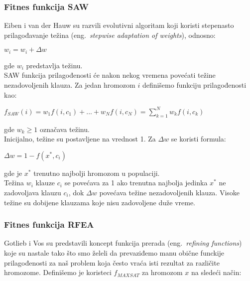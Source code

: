 \documentclass{article}
\begin{document}
\subsubsection{Fitnes funkcija SAW}
\label{sec:fitness_saw}

Eiben i van der Hauw su razvili evolutivni algoritam koji koristi stepenasto prilagođavanje težina (eng.~{\em stepwise adaptation of weights}), odnosno:

	\begin{center}
	$ w_i = w_i + \Delta w $
	\end{center}
	
gde $ w_i $ predstavlja težinu. \\

SAW funkcija prilagođenosti će nakon nekog vremena povećati težine nezadovoljenih klauza. Za jedan hromozom $ i $ definišemo funkciju prilagođenosti kao:\\

	\begin{center}
	$ f_{SAW}(i) = w_1 f(i, c_1) + ... + w_N f(i, c_N) = \sum_{k=1}^{N} w_k f(i, c_k)	$
	\end{center}
	
gde $w_k \geq 1 $ označava težinu.\\

Inicijalno, težine su postavljene na vrednost 1. Za $ \Delta w $ se koristi formula:

	\begin{center}
	$ \Delta w = 1 - f(x^*, c_i) $
	\end{center}
	
gde  je $x^*$ trenutno najbolji hromozom u populaciji. \\

Težina $w_i$ klauze $c_i$ se povećava za 1 ako trenutna najbolja jedinka $x^*$ ne zadovoljava klauzu $c_i$, dok $\Delta w$ povećava težine nezadovoljenih klauza. Visoke težine su dobijene klauzama koje nisu zadovoljene duže vreme. 

\subsubsection{Fitnes funkcija RFEA}
\label{sec:fitness_rfea}
Gotlieb i Vos su predstavili koncept funkcija prerada (eng.~{\em refining functions}) koje su nastale tako što smo želeli da prevaziđemo manu obične funckije prilagođenosti za naš problem koja često vraća isti rezultat za različite hromozome. Definišemo je koristeci $ f_{MAXSAT} $ za hromozom $x$ na sledeći način:
\end{document}
